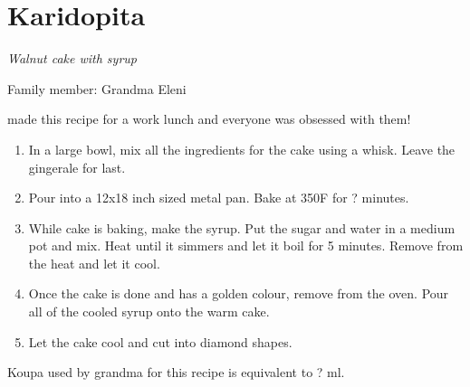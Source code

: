 \chapter{Karidopita}
\label{ch:karidopita}


\textit{Walnut cake with syrup}

Family member: Grandma Eleni

 made this recipe for a work lunch and everyone was obsessed with them!

\begin{enumerate}
    \item In a large bowl, mix all the ingredients for the cake using a whisk. Leave the gingerale for last.
    \item Pour into a 12x18 inch sized metal pan. Bake at 350\degree F for ? minutes.
    \item While cake is baking, make the syrup. Put the sugar and water in a medium pot and mix. Heat until it simmers and let it boil for 5 minutes. Remove from the heat and let it cool.
    \item Once the cake is done and has a golden colour, remove from the oven. Pour all of the cooled syrup onto the warm cake.
    \item Let the cake cool and cut into diamond shapes.
\end{enumerate}

Koupa used by grandma for this recipe is equivalent to ? ml.

